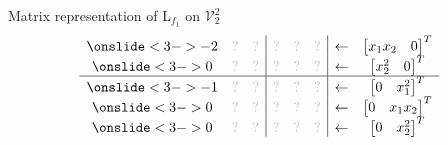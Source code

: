 \documentclass[10pt,T]{beamer}
\newcommand{\transparent}[1]{\textcolor{lightgray}{#1}}
\begin{document}
\begin{frame}[b]{Matrix representation of L$_{f_1}$ on $\mathcal{V}_2^2$}
\begin{equation*}
\begin{array}{ccc|ccc|cc}
    \onslide<3->{-2}&\transparent{?}&\transparent{?}&\transparent{?}&\transparent{?}&\transparent{?}&\leftarrow&\begin{bmatrix}x_1x_2&0\end{bmatrix}^T\\
    \onslide<3->{0}&\transparent{?}&\transparent{?}&\transparent{?}&\transparent{?}&\transparent{?}&\leftarrow&\begin{bmatrix}x_2^2&0\end{bmatrix}^T\\\hline
    \onslide<3->{-1}&\transparent{?}&\transparent{?}&\transparent{?}&\transparent{?}&\transparent{?}&\leftarrow&\begin{bmatrix}0&x_1^2\end{bmatrix}^T\\
    \onslide<3->{0}&\transparent{?}&\transparent{?}&\transparent{?}&\transparent{?}&\transparent{?}&\leftarrow&\begin{bmatrix}0&x_1x_2\end{bmatrix}^T\\
    \onslide<3->{0}&\transparent{?}&\transparent{?}&\transparent{?}&\transparent{?}&\transparent{?}&\leftarrow&\begin{bmatrix}0&x_2^2\end{bmatrix}^T
    \end{array}
\end{equation*}
\end{frame}
\end{document}
